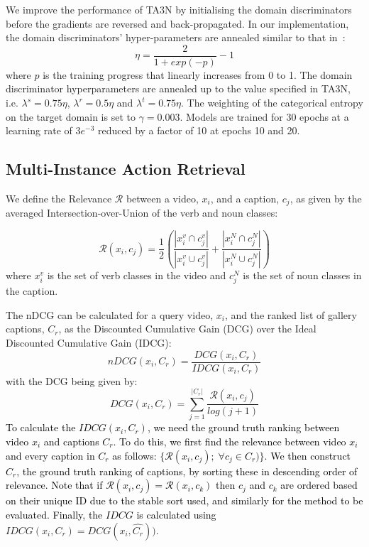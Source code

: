 \documentclass[twocolumn]{svjour3}          \smartqed
\newcommand{\chParagraph}[1]{\noindent {\textbf{#1.}} \hspace{6pt}}
\newcommand{\edits}[1]{\textcolor{black}{#1}}
\begin{document}
    We improve the performance of TA3N by initialising the domain discriminators before the gradients are reversed and back-propagated. In our implementation, the domain discriminators' hyper-parameters are annealed similar to that in~\cite{ganin2016domain}:
    \begin{equation}
        \eta = \frac{2}{1+ exp(-p)} -1
        \label{eq:annealing}
    \end{equation}
    where $p$ is the training progress that linearly increases from 0 to 1.
    The domain discriminator hyperparameters are annealed up to the value specified in TA3N, i.e. $\lambda^s = 0.75\eta$, $\lambda^r=0.5\eta$ and $\lambda^t=0.75\eta$.
    The weighting of the categorical entropy on the target domain is set to $\gamma=0.003$.
    Models are trained for 30 epochs at a learning rate of $3e^{-3}$ reduced by a factor of 10 at epochs 10 and 20.
    

\subsection{Multi-Instance Action Retrieval}
\label{sec:appendix-retrieval}
\chParagraph{Evaluation Metrics}
We define the Relevance $\mathcal{R}$ between a video, $x_i$, and a caption, $c_j$, as given by the averaged Intersection-over-Union of the verb and noun classes:

\begin{equation}
    \mathcal{R}(x_i, c_j) = \frac{1}{2} \left(\frac{|x_i^v \cap c_j^v|}{|x_i^v \cup c_j^v|} + \frac{|x_i^N \cap c_j^N|}{|x_i^N \cup c_j^N|}\right)
    \label{eq:retrieval-relevance}
\end{equation}
where $x_i^v$ is the set of verb classes in the video and $c_j^N$ is the set of noun classes in the caption.

The nDCG can be calculated for a query video, $x_i$, and the ranked list of gallery captions, $C_r$, as the Discounted Cumulative Gain (DCG) over the Ideal Discounted Cumulative Gain (IDCG):
\begin{equation}
    nDCG(x_i, C_r) = \frac{DCG(x_i, C_r)}{IDCG(x_i, C_r)}
\end{equation}
with the DCG being given by:
\begin{equation}
    DCG(x_i, C_r) = \sum_{j=1}^{|C_r|} \frac{\mathcal{R}(x_i, c_j)}{log(j+1)}
    \label{eq:ndcg}
\end{equation}
\edits{To calculate the $IDCG(x_i, C_r)$, we need the ground truth ranking between video $x_i$ and captions $C_r$.
    To do this, we first find the relevance between video $x_i$ and every caption in $C_r$ as follows: $\{\mathcal{R}(x_i, c_j); \; \forall c_j \in C_r)\}$. We then construct $\hat{C}_r$, the ground truth ranking of captions, by sorting these in descending order of relevance. Note that if $\mathcal{R}(x_i, c_j) = \mathcal{R}(x_i, c_k)$ then $c_j$ and $c_k$ are ordered based on their unique ID due to the stable sort used, and similarly for the method to be evaluated.
    Finally, the $IDCG$ is calculated using} $IDCG(x_i, C_r)=DCG(x_i, \hat{C_r}))$.
\end{document}
